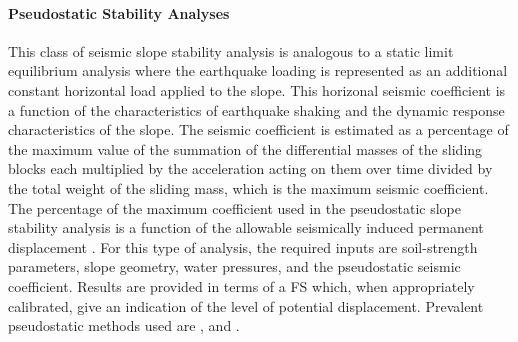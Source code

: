 \paragraph{Pseudostatic Stability Analyses} 
This class of seismic slope stability analysis is analogous to a static limit equilibrium analysis where the earthquake loading is represented as an additional constant horizontal load applied to the slope. This horizonal seismic coefficient is a function of the characteristics of earthquake shaking and the dynamic response characteristics of the slope. The seismic coefficient is estimated as a percentage of the maximum value of the summation of the differential masses of the sliding blocks each multiplied by the acceleration acting on them over time divided by the total weight of the sliding mass, which is the maximum seismic coefficient. The percentage of the maximum coefficient used in the pseudostatic slope stability analysis is a function of the allowable seismically induced permanent displacement \citep{bray2009pseudostatic}. For this type of analysis, the required inputs are soil-strength parameters, slope geometry, water pressures, and the pseudostatic seismic coefficient. Results are provided in terms of a FS which, when appropriately calibrated, give an indication of the level of potential displacement. Prevalent pseudostatic methods used are \cite{seed1979considerations, hynes-griffin1984rationalizing, bray2009pseudostatic, macedo2018performancebased}, and \cite{bray2019procedure}.

